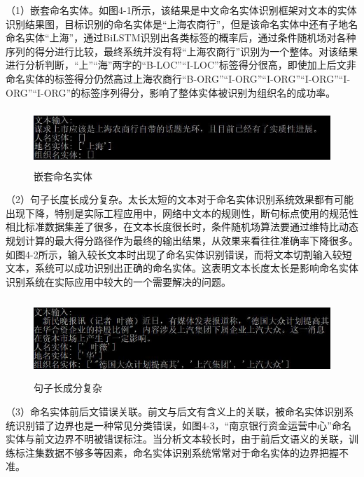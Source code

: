 \documentclass[winfonts,master,oneside,nobackinfo]{njuthesis}
\begin{document}
（1）嵌套命名实体。如图4-1所示，该结果是中文命名实体识别框架对文本的实体识别结果图，目标识别的命名实体是“上海农商行”，但是该命名实体中还有子地名命名实体“上海”，通过BiLSTM识别出各类标签的概率后，通过条件随机场对各种序列的得分进行比较，最终系统并没有将“上海农商行”识别为一个整体。对该结果进行分析判断，“上”“海”两字的“B-LOC”“I-LOC”标签得分很高，即使加上后文非命名实体的标签得分仍然高过上海农商行“B-ORG”“I-ORG”“I-ORG”“I-ORG”“I-ORG”“I-ORG”的标签序列得分，影响了整体实体被识别为组织名的成功率。

\begin{figure}[H]
\centering
\begin{minipage}[t]{\textwidth}
\includegraphics[width=1\textwidth,height=2.14cm]{./figure/嵌套命名实体.jpg}
\caption{嵌套命名实体}
\label{lab:1}
\end{minipage}
\end{figure}

（2）句子长度长成分复杂。太长太短的文本对于命名实体识别系统效果都有可能出现下降，特别是实际工程应用中，网络中文本的规则性，断句标点使用的规范性相比标准数据集差了很多，在文本长度很长时，条件随机场算法要通过维特比动态规划计算的最大得分路径作为最终的输出结果，从效果来看往往准确率下降很多。如图4-2所示，输入较长文本时出现了命名实体识别错误，而将文本切割输入较短文本，系统可以成功识别出正确的命名实体。这表明文本长度太长是影响命名实体识别系统在实际应用中较大的一个需要解决的问题。


\begin{figure}[H]
\centering
\begin{minipage}[t]{\textwidth}
\includegraphics[width=1\textwidth,height=3cm]{./figure/句子长成分复杂.jpg}
\caption{句子长成分复杂}
\label{lab:1}
\end{minipage}
\end{figure}

（3）命名实体前后文错误关联。前文与后文有含义上的关联，被命名实体识别系统识别错了边界也是一种常见分类错误，如图4-3，“南京银行资金运营中心”命名实体与前文边界不明被错误标注。当分析文本较长时，由于前后文语义的关联，训练标注集数据不够多等因素，命名实体识别系统常常对于命名实体的边界把握不准。
\end{document}
